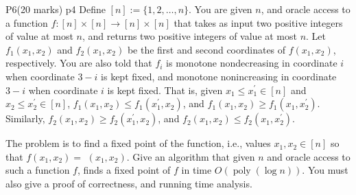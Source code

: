 \documentclass[a4paper, 11pt]{article}
\begin{document}
\begin{problem}{%
		P6\hfill  (20 marks)
	}{p4%
	}
	Define $[n]:=\{1,2, \ldots, n\}$. You are given $n$, and oracle access to a function $f:[n] \times[n] \rightarrow[n] \times[n]$ that takes as input two positive integers of value at most $n$, and returns two positive integers of value at most $n$. Let $f_1\left(x_1, x_2\right)$ and $f_2\left(x_1, x_2\right)$ be the first and second coordinates of $f\left(x_1, x_2\right)$, respectively. You are also told that $f_i$ is monotone nondecreasing in coordinate $i$ when coordinate $3-i$ is kept fixed, and monotone nonincreasing in coordinate $3-i$ when coordinate $i$ is kept fixed. That is, given $x_1 \leq x_1^{\prime} \in[n]$ and $x_2 \leq x_2^{\prime} \in[n]$, $f_1\left(x_1, x_2\right) \leq f_1\left(x_1^{\prime}, x_2\right)$, and $f_1\left(x_1, x_2\right) \geq f_1\left(x_1, x_2^{\prime}\right)$. Similarly, $f_2\left(x_1, x_2\right) \geq f_2\left(x_1^{\prime}, x_2\right)$, and $f_2\left(x_1, x_2\right) \leq f_2\left(x_1, x_2^{\prime}\right)$.\parinn
	
	The problem is to find a fixed point of the function, i.e., values $x_1, x_2 \in[n]$ so that $f\left(x_1, x_2\right)=$ $\left(x_1, x_2\right)$. Give an algorithm that given $n$ and oracle access to such a function $f$, finds a fixed point of $f$ in time $O(\operatorname{poly}(\log n))$. You must also give a proof of correctness, and running time analysis.
\end{problem}
\end{document}
